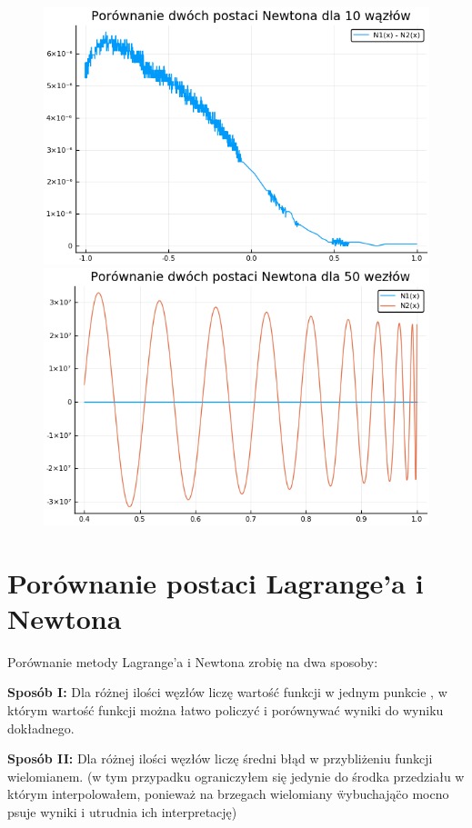 \documentclass[a4paper]{article}
\begin{document}
\begin{figure}[h]
  \centering
  \includegraphics[scale=0.6]{NewtonsComp10.png}
  \includegraphics[scale=0.6]{NewtonsComp50.png}
\end{figure}

\newpage
\section{Porównanie postaci Lagrange'a i Newtona}
Porównanie metody Lagrange'a i Newtona zrobię na dwa sposoby:

\textbf{Sposób I:} Dla różnej ilości węzłów liczę wartość funkcji w jednym punkcie
, w którym wartość funkcji można łatwo policzyć i porównywać wyniki do wyniku 
dokładnego.

\textbf{Sposób II:} Dla różnej ilości węzłów liczę średni błąd w przybliżeniu 
funkcji wielomianem. (w tym przypadku ograniczyłem się jedynie do środka 
przedziału w którym interpolowałem, ponieważ na brzegach wielomiany \"wybuchają\"
co mocno psuje wyniki i utrudnia ich interpretację)
\end{document}
